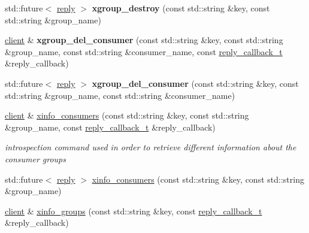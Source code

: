 \begin{DoxyCompactItemize}
\item 
\mbox{\label{classcpp__redis_1_1client_a22440ee971e442a217098e0a55c1d5c7}} 
std\+::future$<$ \mbox{\hyperlink{classcpp__redis_1_1reply}{reply}} $>$ {\bfseries xgroup\+\_\+destroy} (const std\+::string \&key, const std\+::string \&group\+\_\+name)
\item 
\mbox{\label{classcpp__redis_1_1client_a02aaed2ec3345ff5686f79fc7c1ba765}} 
\mbox{\hyperlink{classcpp__redis_1_1client}{client}} \& {\bfseries xgroup\+\_\+del\+\_\+consumer} (const std\+::string \&key, const std\+::string \&group\+\_\+name, const std\+::string \&consumer\+\_\+name, const \mbox{\hyperlink{classcpp__redis_1_1client_af7a65eb21aa25230bfbb0b0203c4fc04}{reply\+\_\+callback\+\_\+t}} \&reply\+\_\+callback)
\item 
\mbox{\label{classcpp__redis_1_1client_a428d246b816234a80e21a1e0b2e0b922}} 
std\+::future$<$ \mbox{\hyperlink{classcpp__redis_1_1reply}{reply}} $>$ {\bfseries xgroup\+\_\+del\+\_\+consumer} (const std\+::string \&key, const std\+::string \&group\+\_\+name, const std\+::string \&consumer\+\_\+name)
\item 
\mbox{\hyperlink{classcpp__redis_1_1client}{client}} \& \mbox{\hyperlink{classcpp__redis_1_1client_a972e59c216b86e38a1b77a4ca0bc6785}{xinfo\+\_\+consumers}} (const std\+::string \&key, const std\+::string \&group\+\_\+name, const \mbox{\hyperlink{classcpp__redis_1_1client_af7a65eb21aa25230bfbb0b0203c4fc04}{reply\+\_\+callback\+\_\+t}} \&reply\+\_\+callback)
\begin{DoxyCompactList}\small\item\em introspection command used in order to retrieve different information about the consumer groups \end{DoxyCompactList}\item 
std\+::future$<$ \mbox{\hyperlink{classcpp__redis_1_1reply}{reply}} $>$ \mbox{\hyperlink{classcpp__redis_1_1client_a6497165de42557c953189305a0f22542}{xinfo\+\_\+consumers}} (const std\+::string \&key, const std\+::string \&group\+\_\+name)
\item 
\mbox{\hyperlink{classcpp__redis_1_1client}{client}} \& \mbox{\hyperlink{classcpp__redis_1_1client_a99175a1ba56a05cc75c531860aaf5442}{xinfo\+\_\+groups}} (const std\+::string \&key, const \mbox{\hyperlink{classcpp__redis_1_1client_af7a65eb21aa25230bfbb0b0203c4fc04}{reply\+\_\+callback\+\_\+t}} \&reply\+\_\+callback)

\end{DoxyCompactItemize}
